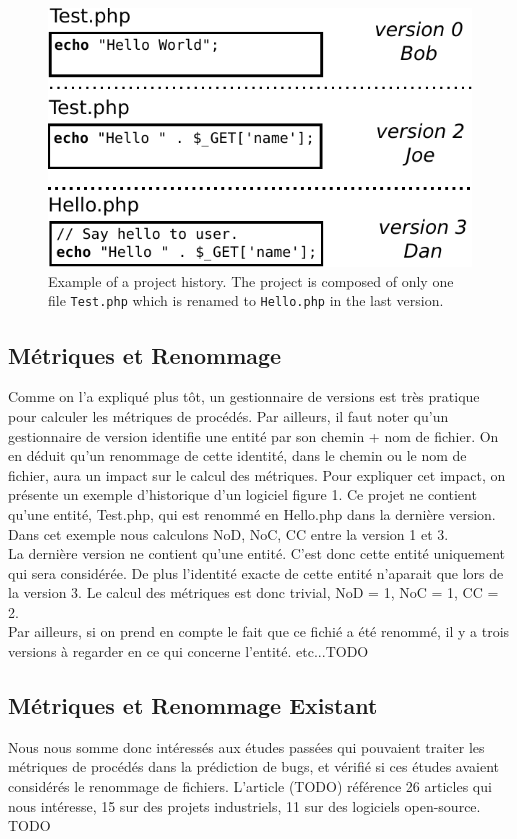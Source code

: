 \begin{figure}[t]
	\centering
	\includegraphics[width=0.8\linewidth,keepaspectratio]{data/figures/example.pdf}
	\caption{Example of a project history. The project is composed of only one file \texttt{Test.php} which is renamed to \texttt{Hello.php} in the last version.}
	\label{fig:example}
\end{figure}

\subsection{Métriques et Renommage}
Comme on l'a expliqué plus tôt, un gestionnaire de versions est très pratique pour calculer les métriques de procédés. Par ailleurs, il faut noter qu'un gestionnaire de version identifie une entité par son chemin + nom de fichier. On en déduit qu'un renommage de cette identité, dans le chemin ou le nom de fichier, aura un impact sur le calcul des métriques. Pour expliquer cet impact, on présente un exemple d'historique d'un logiciel figure 1. Ce projet ne contient qu'une entité, Test.php, qui est renommé en Hello.php dans la dernière version. Dans cet exemple nous calculons NoD, NoC, CC entre la version 1 et 3.\\
La dernière version ne contient qu'une entité. C'est donc cette entité uniquement qui sera considérée. De plus l'identité exacte de cette entité n'aparait que lors de la version 3. Le calcul des métriques est donc trivial, NoD = 1, NoC = 1, CC = 2.\\
Par ailleurs, si on prend en compte le fait que ce fichié a été renommé, il y a trois versions à regarder en ce qui concerne l'entité. etc...TODO\\

\subsection{Métriques et Renommage Existant}
Nous nous somme donc intéressés aux études passées qui pouvaient traiter les métriques de procédés dans la prédiction de bugs, et vérifié si ces études avaient considérés le renommage de fichiers. L'article (TODO) référence 26 articles qui nous intéresse, 15 sur des projets industriels, 11 sur des logiciels open-source. TODO \\

